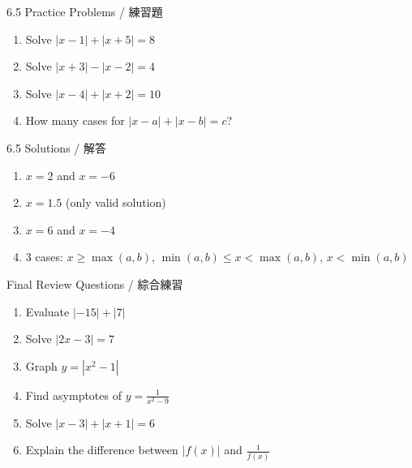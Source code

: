 \documentclass[aspectratio=169]{beamer}
\begin{document}
\begin{frame}{6.5 Practice Problems / 練習題}
    \begin{tcolorbox}[colback=lightgray,colframe=accent,title=Practice]
        \footnotesize
        \begin{enumerate}
            \item Solve $|x-1| + |x+5| = 8$
            \item Solve $|x+3| - |x-2| = 4$
            \item Solve $|x-4| + |x+2| = 10$
            \item How many cases for $|x-a| + |x-b| = c$?
        \end{enumerate}
    \end{tcolorbox}
\end{frame}

\begin{frame}{6.5 Solutions / 解答}
    \begin{tcolorbox}[colback=lightgray,colframe=accent,title=Solutions]
        \footnotesize
        \begin{enumerate}
            \item $x = 2$ and $x = -6$
            \item $x = 1.5$ (only valid solution)
            \item $x = 6$ and $x = -4$
            \item 3 cases: $x \geq \max(a,b)$, $\min(a,b) \leq x < \max(a,b)$, $x < \min(a,b)$
        \end{enumerate}
    \end{tcolorbox}
\end{frame}

\begin{frame}{Final Review Questions / 綜合練習}
    \begin{tcolorbox}[colback=lightgray,colframe=primary,title=Comprehensive Review]
        \footnotesize
        \begin{enumerate}
            \item Evaluate $|-15| + |7|$
            \item Solve $|2x-3| = 7$
            \item Graph $y = |x^2 - 1|$
            \item Find asymptotes of $y = \frac{1}{x^2-9}$
            \item Solve $|x-3| + |x+1| = 6$
            \item Explain the difference between $|f(x)|$ and $\frac{1}{f(x)}$
        \end{enumerate}
    \end{tcolorbox}
\end{frame}
\end{document}
